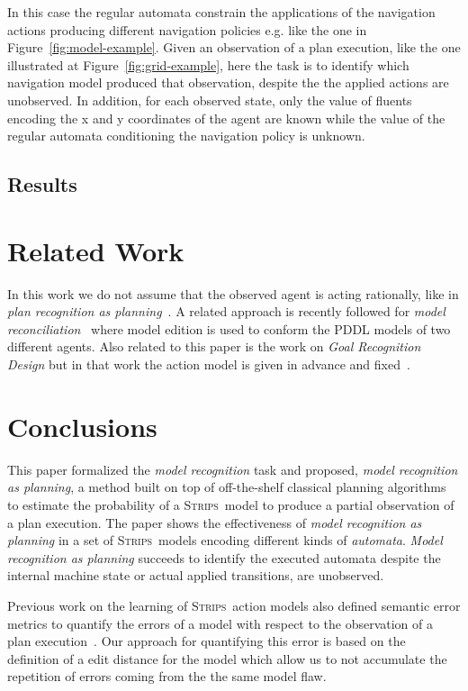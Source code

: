 \documentclass[letterpaper]{article} %
\newcommand{\strips}{\textsc{Strips}}     %
\begin{document}
In this case the regular automata constrain the applications of the navigation actions producing different navigation policies e.g. like the one in Figure~\ref{fig:model-example}. Given an observation of a plan execution, like the one illustrated at Figure~\ref{fig:grid-example}, here the task is to identify which navigation model produced that observation, despite the the applied actions are unobserved. In addition, for each observed state, only the value of fluents encoding the x and y coordinates of the agent are known while the value of the regular automata conditioning the navigation policy is unknown.



\subsection{Results}


\section{Related Work}
\label{sec:related}
In this work we do not assume that the observed agent is acting rationally, like in {\em plan recognition as planning}~\cite{ramirez2012plan,ramirez2009plan}. A related approach is recently followed for {\em model reconciliation}~\cite{Kambhampati:mreconciliation:ijcai17} where model edition is used to conform the PDDL models of two different agents. Also  related to this paper is the work on {\em Goal Recognition Design} but in that work the action model is given in advance and fixed~\cite{keren2014goal}.  



\section{Conclusions}
\label{sec:conclussions}
This paper formalized the {\em model recognition} task and proposed, {\em model recognition as planning}, a method built on top of off-the-shelf classical planning algorithms to estimate the probability of a \strips\ model to produce a partial observation of a plan execution. The paper shows the effectiveness of {\em model recognition as planning} in a set of \strips\ models encoding different kinds of {\em automata}. {\em Model recognition as planning} succeeds to identify the executed automata despite the internal machine state or actual applied transitions, are unobserved.

Previous work on the learning of \strips\ action models also defined semantic error metrics to quantify the errors of a model with respect to the observation of a plan execution~\cite{yang2007learning}. Our approach for quantifying this error is based on the definition of a edit distance for the model which allow us to not accumulate the repetition of errors coming from the the same model flaw.
\end{document}
